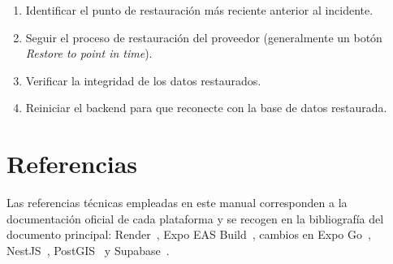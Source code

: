 \begin{enumerate}
    \item Identificar el punto de restauración más reciente anterior al incidente.
    \item Seguir el proceso de restauración del proveedor (generalmente un botón \textit{Restore to point in time}).
    \item Verificar la integridad de los datos restaurados.
    \item Reiniciar el backend para que reconecte con la base de datos restaurada.
\end{enumerate}

\section{Referencias}

Las referencias técnicas empleadas en este manual corresponden a la documentación oficial de cada plataforma y se recogen en la bibliografía del documento principal: Render~\cite{render}, Expo EAS Build~\cite{expoeas}, cambios en Expo Go~\cite{expoGoLoading2026}, NestJS~\cite{nestjs}, PostGIS~\cite{postgisdocs} y Supabase~\cite{supabase}.
